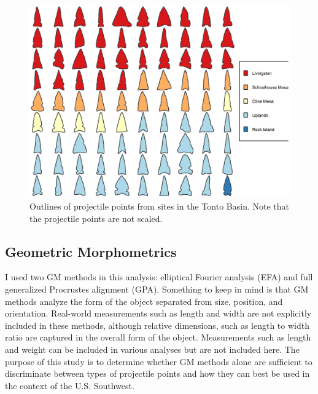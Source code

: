 \documentclass{article}
\begin{document}
\begin{figure}
\includegraphics[width=1\linewidth]{figures/TontoPointsFinal} \caption{Outlines of projectile points from sites in the Tonto Basin. Note that the projectile points are not scaled.}\label{fig:TontoPointsFinal}
\end{figure}

\hypertarget{geometric-morphometrics}{%
\subsection{Geometric Morphometrics}\label{geometric-morphometrics}}

I used two GM methods in this analysis: elliptical Fourier analysis
(EFA) and full generalized Procrustes alignment (GPA). Something to keep
in mind is that GM methods analyze the form of the object separated from
size, position, and orientation. Real-world measurements such as length
and width are not explicitly included in these methods, although
relative dimensions, such as length to width ratio are captured in the
overall form of the object. Measurements such as length and weight can
be included in various analyses but are not included here. The purpose
of this study is to determine whether GM methods alone are sufficient to
discriminate between types of projectile points and how they can best be
used in the context of the U.S. Southwest.
\end{document}
